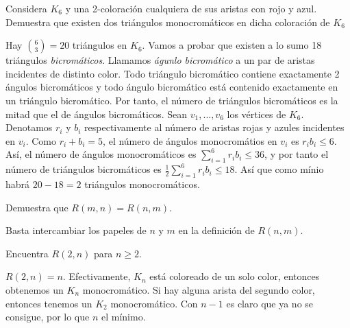 \documentclass[twoside]{article}
\begin{document}
\newpage

\begin{ejercicio}{2.6}
Considera $K_6$ y una 2-coloración cualquiera de sus aristas con rojo y azul. Demuestra que
existen dos triángulos monocromáticos en dicha coloración de $K_6$
\end{ejercicio}
\begin{solucion}
Hay $\binom{6}{3}=20$ triángulos en $K_6$. Vamos a probar que existen a lo sumo 18 triángulos \emph{bicromáticos}. Llamamos \emph{águnlo bicromático} a un par de aristas incidentes de distinto color. Todo triángulo bicromático contiene exactamente 2 ángulos bicromáticos y todo ángulo bicromático está contenido exactamente en un triángulo bicromático. Por tanto, el número de triángulos bicromáticos es la mitad que el de ángulos bicromáticos. Sean $v_1,\dots, v_6$ los vértices de $K_6$. Denotamos $r_i$ y $b_i$ respectivamente al número de aristas rojas y azules incidentes en $v_i$. Como $r_i+b_i=5$, el número de ángulos monocromátios en $v_i$ es $r_ib_i\leq 6$. Así, el número de ángulos monocromáticos es $\sum_{i=1}^6r_ib_i\leq 36$, y por tanto el número de triángulos bicromáticos es  $\frac{1}{2}\sum_{i=1}^6r_ib_i\leq 18$. Así que como mínio habrá $20-18=2$ triángulos monocromáticos. 
\end{solucion}

\newpage

\begin{ejercicio}{2.7}
Demuestra que $R(m, n) = R(n, m)$.
\end{ejercicio}
\begin{solucion}
Basta intercambiar los papeles de $n$ y $m$ en la definición de $R(n,m)$. 
\end{solucion}

\newpage

\begin{ejercicio}{2.8}
Encuentra $R(2, n)$ para $n ≥ 2$.
\end{ejercicio}
\begin{solucion}


$R(2,n)=n$. Efectivamente, $K_n$ está coloreado de un solo color, entonces obtenemos un $K_n$ monocromático. Si hay alguna arista del segundo color, entonces tenemos un $K_2$ monocromático. Con $n-1$ es claro que ya no se consigue, por lo que $n$ el mínimo.


\end{solucion}
\newpage
\end{document}
